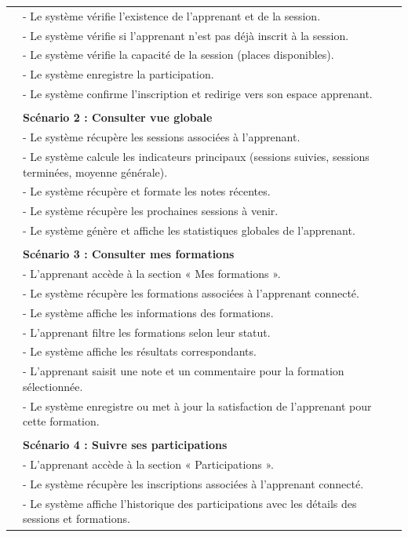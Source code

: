 {\begin{longtable}{|l|p{12cm}|}
&- Le système vérifie l'existence de l'apprenant et de la session. \\
&- Le système vérifie si l'apprenant n'est pas déjà inscrit à la session. \\
&- Le système vérifie la capacité de la session (places disponibles). \\
&- Le système enregistre la participation. \\
&- Le système confirme l'inscription et redirige vers son espace apprenant. \\
\\
& \textbf{Scénario 2 : Consulter vue globale} \\
&- Le système récupère les sessions associées à l'apprenant. \\
&- Le système calcule les indicateurs principaux (sessions suivies, sessions terminées, moyenne générale). \\
&- Le système récupère et formate les notes récentes. \\
&- Le système récupère les prochaines sessions à venir. \\
&- Le système génère et affiche les statistiques globales de l'apprenant. \\
\\
& \textbf{Scénario 3 : Consulter mes formations} \\
&- L'apprenant accède à la section « Mes formations ». \\
&- Le système récupère les formations associées à l'apprenant connecté. \\
&- Le système affiche les informations des formations. \\
&- L'apprenant filtre les formations selon leur statut. \\
&- Le système affiche les résultats correspondants. \\
&- L'apprenant saisit une note et un commentaire pour la formation sélectionnée. \\
&- Le système enregistre ou met à jour la satisfaction de l'apprenant pour cette formation. \\
\\
& \textbf{Scénario 4 : Suivre ses participations} \\
&- L'apprenant accède à la section « Participations ». \\
&- Le système récupère les inscriptions associées à l'apprenant connecté. \\
&- Le système affiche l'historique des participations avec les détails des sessions et formations. \\

\end{longtable}}
